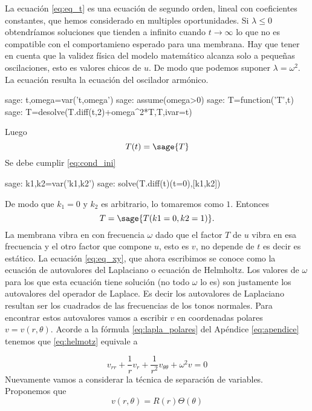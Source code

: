 \documentclass{article}
\newcounter{cor_cont}
\renewcommand{\emph}[1]{\textcolor[rgb]{0,0,1}{#1}}
\begin{document}
La ecuación \eqref{eq:eq_t} es una ecuación de segundo orden, lineal con coeficientes constantes, que hemos considerado en multiples oportunidades. Si $\lambda\leq 0$ obtendríamos soluciones que tienden a infinito cuando $t\to\infty$ lo que no es compatible con el comportamieno esperado para una membrana. Hay que tener en cuenta que la validez física del modelo matemático alcanza solo a pequeñas oscilaciones, esto es valores chicos de $u$. De modo que podemos suponer $\lambda=\omega^2$. La ecuación resulta la ecuación del oscilador armónico. 
\begin{sagecommandline}
sage: t,omega=var('t,omega')
sage: assume(omega>0)
sage: T=function('T',t)
sage: T=desolve(T.diff(t,2)+omega^2*T,T,ivar=t)
\end{sagecommandline}
Luego
\[T(t)=\sage{T}\]
Se debe cumplir \eqref{eq:cond_ini}
\begin{sagecommandline}
sage: k1,k2=var('k1,k2')
sage: solve(T.diff(t)(t=0),[k1,k2])
\end{sagecommandline}
De modo que $k_1=0$ y $k_2$ es arbitrario, lo tomaremos como $1$. Entonces 
\[T=\sage{T(k1=0,k2=1)}.\]
\emph{La membrana vibra en con frecuencia $\omega$} dado que el factor  $T$ de $u$ vibra en esa frecuencia y el otro factor que compone $u$, esto es $v$, no depende de $t$ es decir es estático. 
La ecuación \eqref{eq:eq_xy}, que ahora escribimos
se conoce como la ecuación de autovalores del Laplaciano o ecuación de Helmholtz.  Los valores de $\omega$ para los que esta ecuación tiene solución (no todo $\omega$ lo es)  son justamente los autovalores del operador de Laplace. Es decir los autovalores de Laplaciano resultan ser los cuadrados de las frecuencias de los tonos normales. Para encontrar estos autovalores vamos a escribir $v$ en coordenadas polares $v=v(r,\theta)$. Acorde a la fórmula \eqref{eq:lapla_polares} del Apéndice  \ref{eq:apendice} tenemos que \eqref{eq:helmotz} equivale a

\begin{equation}\label{eq:ecu_aux_1}v_{rr}+\frac{1}{r}v_r+\frac{1}{r^2}v_{\theta\theta}+\omega^2v=0
\end{equation}
Nuevamente vamos a considerar la técnica de separación de variables. Proponemos que
\[v(r,\theta)=R(r)\Theta(\theta)\]
\end{document}

